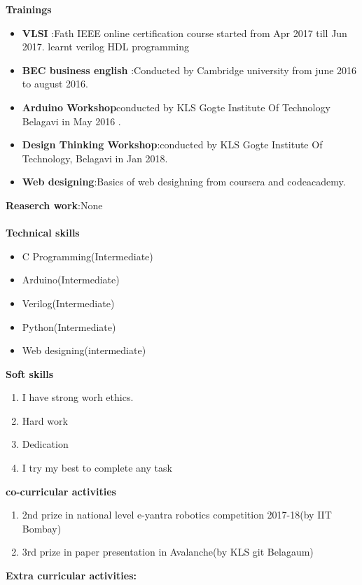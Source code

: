 \documentclass{article}
\begin{document}
\textbf{Trainings}\\[0.1cm]
\begin{itemize}
\item\textbf{ VLSI }:Fath
IEEE online certification course started from  Apr 2017 till Jun 2017.
learnt verilog HDL programming
\item\textbf{BEC business english }:Conducted by Cambridge university from june 2016 to august 2016.
\item\textbf{Arduino Workshop}conducted by KLS Gogte Institute Of Technology Belagavi in 
May 2016 .
\item\textbf{Design Thinking Workshop}:conducted by KLS Gogte Institute Of Technology, Belagavi in Jan 2018.
\item\textbf{Web designing}:Basics of web desighning from coursera and codeacademy. \\
\end{itemize}
\textbf{Reaserch work}:None\\~\\
\textbf{Technical skills}\\
\begin{itemize}
\item C Programming(Intermediate)
\item Arduino(Intermediate)
\item Verilog(Intermediate)
\item Python(Intermediate)
\item Web designing(intermediate)\\
\end{itemize}
\textbf{Soft skills} \\
\begin{enumerate}
\item I have strong worh ethics.
\item Hard work
\item Dedication
\item I try my best to complete any  task\\
\end{enumerate}
\textbf{co-curricular activities}
\begin{enumerate}
\item 2nd prize in national level e-yantra robotics competition 2017-18(by IIT Bombay)
\item 3rd prize in paper presentation in Avalanche(by KLS git Belagaum)\\
\end{enumerate}
\textbf{Extra curricular activities:}\\~\\
\end{document}
